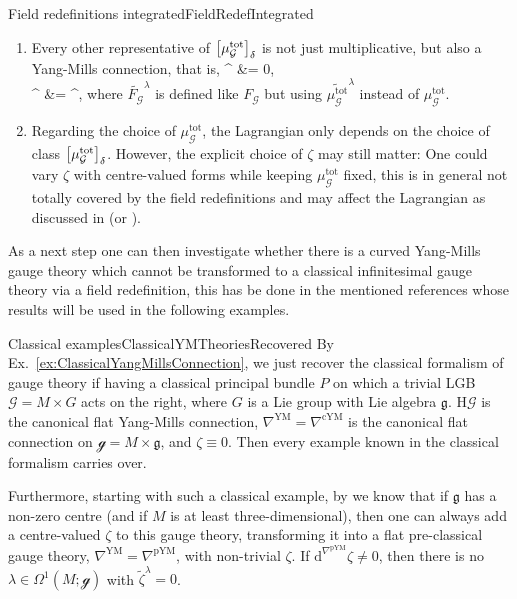 \documentclass[a4paper,oneside,11pt,bibliography=totoc]{scrartcl}
\def\bas#1\eas{\begin{align*}#1\end{align*}}
\theoremstyle{plain}
\theoremstyle{remark}
\theoremstyle{definition}
\begin{document}
\begin{remarks}{Field redefinitions integrated}{FieldRedefIntegrated}
\begin{enumerate}
	\item Every other representative of $\mleft[\mu_{\mathcal{G}}^{\mathrm{tot}}\mright]_{\delta}$ is not just multiplicative, but also a Yang-Mills connection, that is,
	\bas
	\delta {}^{\lambda} &= 0,\\
	^{\lambda} &= \delta\widetilde{\zeta}^{\lambda},
	\eas
	where $\widetilde{F_{\mathcal{G}}}^{\lambda}$ is defined like $F_{\mathcal{G}}$ but using $\widetilde{\mu_{\mathcal{G}}^{\mathrm{tot}}}^{\lambda}$ instead of $\mu_{\mathcal{G}}^{\mathrm{tot}}$.
	\item Regarding the choice of $\mu_{\mathcal{G}}^{\mathrm{tot}}$, the Lagrangian only depends on the choice of class $\mleft[\mu_{\mathcal{G}}^{\mathrm{tot}}\mright]_{\delta}$. However, the explicit choice of $\zeta$ may still matter: One could vary $\zeta$ with centre-valued forms while keeping $\mu_{\mathcal{G}}^{\mathrm{tot}}$ fixed, this is in general not totally covered by the field redefinitions and may affect the Lagrangian as discussed in \cite{MyThesis} (or \cite{My1stpaper}).
\end{enumerate}
\end{remarks}

As a next step one can then investigate whether there is a curved Yang-Mills gauge theory which cannot be transformed to a classical infinitesimal gauge theory via a field redefinition, this has be done in the mentioned references whose results will be used in the following examples.

\begin{examples}{Classical examples}{ClassicalYMTheoriesRecovered}
By Ex.\ \ref{ex:ClassicalYangMillsConnection}, we just recover the classical formalism of gauge theory if having a classical principal bundle $P$ on which a trivial LGB $\mathcal{G} = M \times G$ acts on the right, where $G$ is a Lie group with Lie algebra $\mathfrak{g}$. $\mathrm{H}\mathcal{G}$ is the canonical flat Yang-Mills connection, $\nabla^{\mathrm{YM}}=\nabla^{\mathrm{cYM}}$ is the canonical flat connection on $\mathcal{g} = M \times \mathfrak{g}$, and $\zeta \equiv 0$. Then every example known in the classical formalism carries over.

Furthermore, starting with such a classical example, by \cite[\S 6, Cor.\ 6.2]{My1stpaper} we know that if $\mathfrak{g}$ has a non-zero centre (and if $M$ is at least three-dimensional), then one can always add a centre-valued $\zeta$ to this gauge theory, transforming it into a flat pre-classical gauge theory, $\nabla^{\mathrm{YM}} = \nabla^{\mathrm{pYM}}$, with non-trivial $\zeta$. If $\mathrm{d}^{\nabla^{\mathrm{pYM}}} \zeta \neq 0$, then there is no $\lambda \in \Omega^1(M; \mathcal{g})$ with $\widetilde{\zeta}^\lambda = 0$.
\end{examples}
\end{document}
